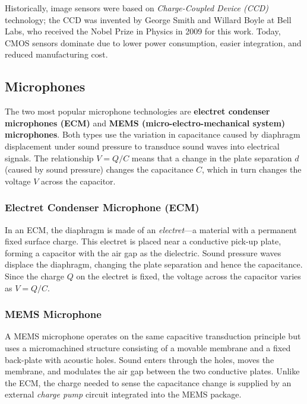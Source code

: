 \documentclass[11pt, a4paper, notitlepage]{report}
\theoremstyle{definition}
\theoremstyle{remark}
\theoremstyle{definition}
\begin{document}
Historically, image sensors were based on \emph{Charge-Coupled Device (CCD)} technology; the CCD was invented by George Smith and Willard Boyle at Bell Labs, who received the Nobel Prize in Physics in 2009 for this work. Today, CMOS sensors dominate due to lower power consumption, easier integration, and reduced manufacturing cost.

\subsection{Microphones}
\label{sec:microphone}

The two most popular microphone technologies are \textbf{electret condenser microphones (ECM)} and \textbf{MEMS (micro-electro-mechanical system) microphones}. Both types use the variation in capacitance caused by diaphragm displacement under sound pressure to transduce sound waves into electrical signals. The relationship $V = Q/C$ means that a change in the plate separation $d$ (caused by sound pressure) changes the capacitance $C$, which in turn changes the voltage $V$ across the capacitor.

\subsubsection{Electret Condenser Microphone (ECM)}

In an ECM, the diaphragm is made of an \emph{electret}---a material with a permanent fixed surface charge. This electret is placed near a conductive pick-up plate, forming a capacitor with the air gap as the dielectric. Sound pressure waves displace the diaphragm, changing the plate separation and hence the capacitance. Since the charge $Q$ on the electret is fixed, the voltage across the capacitor varies as $V = Q/C$.

\subsubsection{MEMS Microphone}

A MEMS microphone operates on the same capacitive transduction principle but uses a micromachined structure consisting of a movable membrane and a fixed back-plate with acoustic holes. Sound enters through the holes, moves the membrane, and modulates the air gap between the two conductive plates. Unlike the ECM, the charge needed to sense the capacitance change is supplied by an external \emph{charge pump} circuit integrated into the MEMS package.
\end{document}
